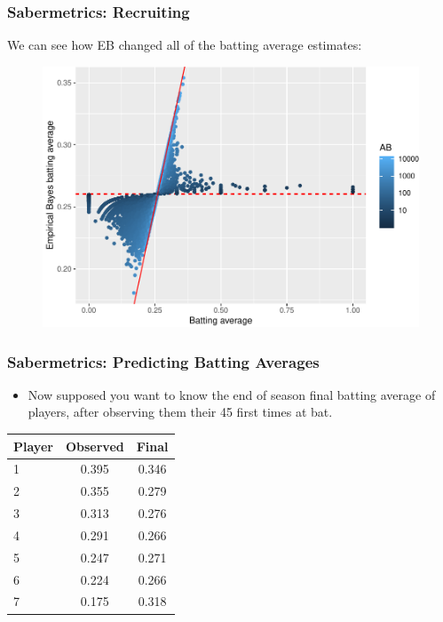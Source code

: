 \documentclass[
  shownotes,
  xcolor={svgnames},
  hyperref={colorlinks,citecolor=DarkBlue,linkcolor=DarkRed,urlcolor=DarkBlue}
  ]{beamer}
\begin{document}
\begin{frame}[fragile]
\frametitle{Sabermetrics: Recruiting}

We can see how EB changed all of the batting average estimates:

\begin{figure}[H] \centering
  \centering
  \includegraphics[scale=0.5]{figures/shrinkage_averages}
  \\
  \tiny 
\end{figure}



\end{frame}
\begin{frame}[fragile]
\frametitle{Sabermetrics: Predicting Batting Averages}

\begin{itemize}
\item Now supposed you want to know the end of season final batting average of players, after observing them their 45 first times at bat.
\end{itemize}


\begin{table}[H]
\begin{tabular}{lcc}
\hline
\hline
Player & Observed & Final \\
\hline
1 & 0.395 & 0.346 \\
2 & 0.355 & 0.279 \\
3 & 0.313 & 0.276 \\
4 & 0.291 & 0.266 \\
5 & 0.247 & 0.271 \\
6 & 0.224 & 0.266 \\
7 & 0.175 & 0.318 \\
\hline
\hline
\end{tabular}
\end{table}
\end{frame}
\end{document}
